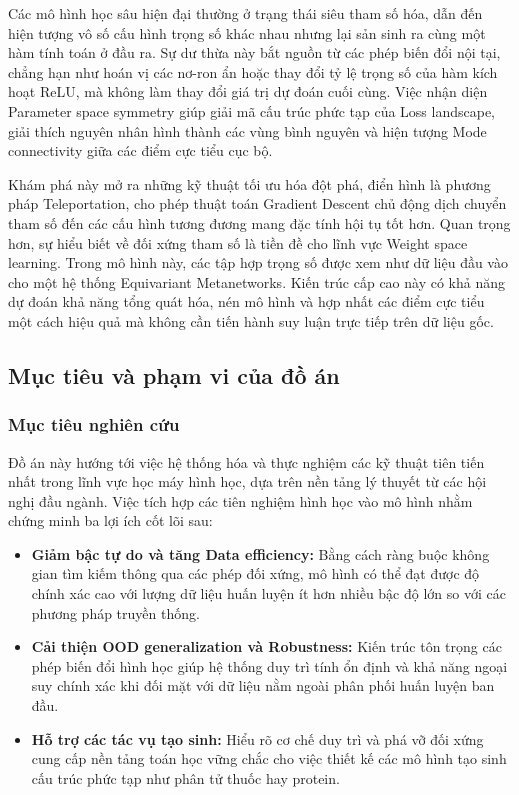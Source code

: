 Các mô hình học sâu hiện đại thường ở trạng thái siêu tham số hóa, dẫn đến hiện tượng vô số cấu hình trọng số khác nhau nhưng lại sản sinh ra cùng một hàm tính toán ở đầu ra. Sự dư thừa này bắt nguồn từ các phép biến đổi nội tại, chẳng hạn như hoán vị các nơ-ron ẩn hoặc thay đổi tỷ lệ trọng số của hàm kích hoạt ReLU, mà không làm thay đổi giá trị dự đoán cuối cùng. Việc nhận diện Parameter space symmetry giúp giải mã cấu trúc phức tạp của Loss landscape, giải thích nguyên nhân hình thành các vùng bình nguyên và hiện tượng Mode connectivity giữa các điểm cực tiểu cục bộ.

\begin{morong}
Khám phá này mở ra những kỹ thuật tối ưu hóa đột phá, điển hình là phương pháp Teleportation, cho phép thuật toán Gradient Descent chủ động dịch chuyển tham số đến các cấu hình tương đương mang đặc tính hội tụ tốt hơn. Quan trọng hơn, sự hiểu biết về đối xứng tham số là tiền đề cho lĩnh vực Weight space learning. Trong mô hình này, các tập hợp trọng số được xem như dữ liệu đầu vào cho một hệ thống Equivariant Metanetworks. Kiến trúc cấp cao này có khả năng dự đoán khả năng tổng quát hóa, nén mô hình và hợp nhất các điểm cực tiểu một cách hiệu quả mà không cần tiến hành suy luận trực tiếp trên dữ liệu gốc.
\end{morong}

\subsection{Mục tiêu và phạm vi của đồ án}
\label{subsec:muc-tieu-va-pham-vi}

\subsubsection{Mục tiêu nghiên cứu}
\label{subsubsec:muc-tieu-nghien-cuu}

Đồ án này hướng tới việc hệ thống hóa và thực nghiệm các kỹ thuật tiên tiến nhất trong lĩnh vực học máy hình học, dựa trên nền tảng lý thuyết từ các hội nghị đầu ngành. Việc tích hợp các tiên nghiệm hình học vào mô hình nhằm chứng minh ba lợi ích cốt lõi sau:

\begin{itemize}
    \item \textbf{Giảm bậc tự do và tăng Data efficiency:} Bằng cách ràng buộc không gian tìm kiếm thông qua các phép đối xứng, mô hình có thể đạt được độ chính xác cao với lượng dữ liệu huấn luyện ít hơn nhiều bậc độ lớn so với các phương pháp truyền thống.
    \item \textbf{Cải thiện OOD generalization và Robustness:} Kiến trúc tôn trọng các phép biến đổi hình học giúp hệ thống duy trì tính ổn định và khả năng ngoại suy chính xác khi đối mặt với dữ liệu nằm ngoài phân phối huấn luyện ban đầu.
    \item \textbf{Hỗ trợ các tác vụ tạo sinh:} Hiểu rõ cơ chế duy trì và phá vỡ đối xứng cung cấp nền tảng toán học vững chắc cho việc thiết kế các mô hình tạo sinh cấu trúc phức tạp như phân tử thuốc hay protein.
\end{itemize}

